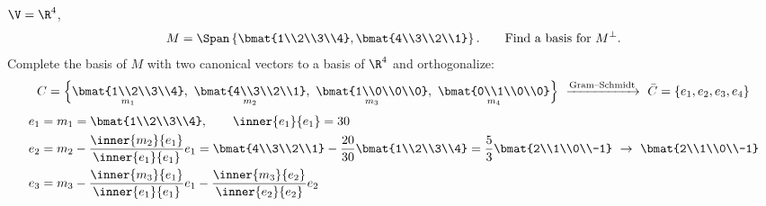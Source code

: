 \begin{example}
$\V=\R^4$,
\[
M=\Span\left\{\bmat{1\\2\\3\\4},\bmat{4\\3\\2\\1}\right\}. \qquad \text{Find a basis for } M^\perp.
\]
Complete the basis of $M$ with two canonical vectors to a basis of $\R^4$ and orthogonalize:
\[
C=\Big\{\underset{m_1}{\bmat{1\\2\\3\\4}},\ \underset{m_2}{\bmat{4\\3\\2\\1}},\ \underset{m_3}{\bmat{1\\0\\0\\0}},\ \underset{m_4}{\bmat{0\\1\\0\\0}}\Big\}
\ \xrightarrow{\text{Gram--Schmidt}}\ \bar C=\{e_1,e_2,e_3,e_4\}
\]
\begin{align*}
e_1&=m_1=\bmat{1\\2\\3\\4}, \qquad \inner{e_1}{e_1}=30\\
e_2&=m_2-\frac{\inner{m_2}{e_1}}{\inner{e_1}{e_1}}e_1=\bmat{4\\3\\2\\1}-\frac{20}{30}\bmat{1\\2\\3\\4}=\frac53\bmat{2\\1\\0\\-1}\ \to\ \bmat{2\\1\\0\\-1}\\
e_3&=m_3-\frac{\inner{m_3}{e_1}}{\inner{e_1}{e_1}}e_1-\frac{\inner{m_3}{e_2}}{\inner{e_2}{e_2}}e_2

\end{align*}
\end{example}
